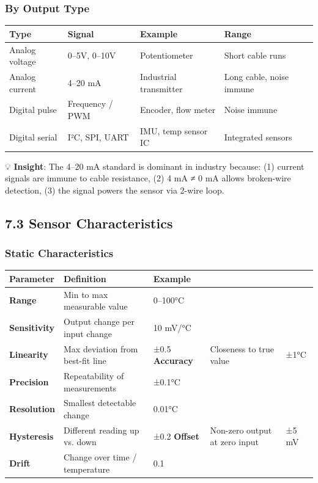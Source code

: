 \documentclass[11pt,a4paper]{book}
\begin{document}
\subsubsection{By Output Type}

\begin{center}
\begin{tabular}{|l|l|l|l|}
\hline
Type & Signal & Example & Range \\
\hline
Analog voltage & 0–5V, 0–10V & Potentiometer & Short cable runs \\
Analog current & 4–20 mA & Industrial transmitter & Long cable, noise immune \\
Digital pulse & Frequency / PWM & Encoder, flow meter & Noise immune \\
Digital serial & I²C, SPI, UART & IMU, temp sensor IC & Integrated sensors \\
\hline
\end{tabular}
\end{center}

💡 \textbf{Insight}: The 4–20 mA standard is dominant in industry because: (1) current signals are immune to cable resistance, (2) 4 mA ≠ 0 mA allows broken-wire detection, (3) the signal powers the sensor via 2-wire loop.

\medskip\noindent\hrulefill\medskip

\subsection{7.3 Sensor Characteristics}

\subsubsection{Static Characteristics}

\begin{center}
\begin{tabular}{|l|l|l|}
\hline
Parameter & Definition & Example \\
\hline
\textbf{Range} & Min to max measurable value & 0–100°C \\
\textbf{Sensitivity} & Output change per input change & 10 mV/°C \\
\textbf{Linearity} & Max deviation from best-fit line & ±0.5%
\textbf{Accuracy} & Closeness to true value & ±1°C \\
\textbf{Precision} & Repeatability of measurements & ±0.1°C \\
\textbf{Resolution} & Smallest detectable change & 0.01°C \\
\textbf{Hysteresis} & Different reading up vs. down & ±0.2%
\textbf{Offset} & Non-zero output at zero input & ±5 mV \\
\textbf{Drift} & Change over time / temperature & 0.1%
\hline
\end{tabular}
\end{center}
\end{document}
